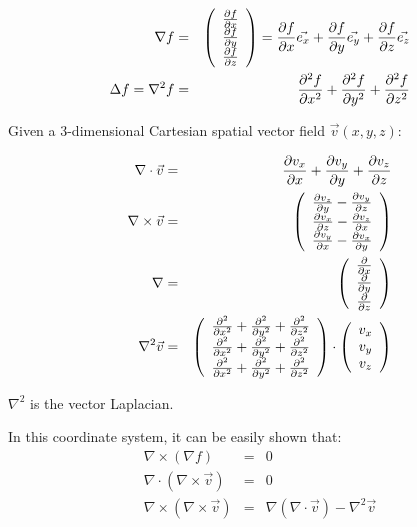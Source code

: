 \documentclass[a4paper,10pt]{article}
\newcommand{\pderiv}[2]{\ensuremath\frac{\partial #2}{\partial #1}}
\newcommand{\pdx}[1]{\ensuremath\pderiv{x}{#1}}
\newcommand{\pdxsq}[1]{\ensuremath\pderiv{x^2}{^2 #1}}
\newcommand{\pdy}[1]{\ensuremath\pderiv{y}{#1}}
\newcommand{\pdysq}[1]{\ensuremath\pderiv{y^2}{^2 #1}}
\newcommand{\pdz}[1]{\ensuremath\pderiv{z}{#1}}
\newcommand{\pdzsq}[1]{\ensuremath\pderiv{z^2}{^2 #1}}
\begin{document}
\begin{eqnarray}
  \nabla f &=& \left(\begin{array}{c} \pdx{f} \\ \pdy{f} \\ \pdz{f} \end{array}\right)
    = \pdx{f}\vec{e_x} + \pdy{f} \vec{e_y} + \pdz{f} \vec{e_z} \\
  \Delta f = \nabla^2 f& =& \pdxsq{f} + \pdysq{f} + \pdzsq{f}
\end{eqnarray}

Given a 3-dimensional Cartesian spatial vector field $\vec{v}(x, y, z)$:

\begin{eqnarray}
  \nabla \cdot \vec{v} &=& \pdx{v_x} + \pdy{v_y} + \pdz{v_z} \\
  \nabla \times \vec{v} &=& \left(\begin{array}{c}
    \pdy{v_z} - \pdz{v_y} \\
    \pdz{v_x} - \pdx{v_z} \\
    \pdx{v_y} - \pdy{v_x}
    \end{array}\right) \\
  \nabla &=& \left(\begin{array}{c} \pdx{} \\ \pdy{} \\ \pdz{} \end{array}\right) \\
  \nabla^2 \vec{v} &=&
    \left(\begin{array}{c}
      \pdxsq{} + \pdysq{} + \pdzsq{} \\
      \pdxsq{} + \pdysq{} + \pdzsq{} \\
      \pdxsq{} + \pdysq{} + \pdzsq{}
    \end{array}\right) \cdot \left(\begin{array}{c}
      v_x \\
      v_y \\
      v_z
    \end{array}\right)
\end{eqnarray}

$\nabla^2$ is the vector Laplacian.

In this coordinate system, it can be easily shown that:
\begin{eqnarray}
  \nabla \times (\nabla f) &=& 0 \\
  \nabla \cdot (\nabla \times \vec{v}) &=& 0 \\
  \nabla \times (\nabla \times \vec{v}) &=& \nabla(\nabla \cdot \vec{v}) - \nabla^2 \vec{v}
\end{eqnarray}
\end{document}
